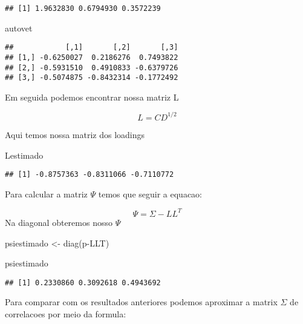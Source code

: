 \documentclass[
]{article}
\newenvironment{Shaded}{\begin{snugshade}}{\end{snugshade}}
\newcommand{\FunctionTok}[1]{\textcolor[rgb]{0.00,0.00,0.00}{#1}}
\newcommand{\NormalTok}[1]{#1}
\newcommand{\OtherTok}[1]{\textcolor[rgb]{0.56,0.35,0.01}{#1}}
\newcommand{\SpecialCharTok}[1]{\textcolor[rgb]{0.00,0.00,0.00}{#1}}
\begin{document}
\begin{verbatim}
## [1] 1.9632830 0.6794930 0.3572239
\end{verbatim}

\begin{Shaded}
\begin{Highlighting}[]
\NormalTok{autovet}
\end{Highlighting}
\end{Shaded}

\begin{verbatim}
##            [,1]       [,2]       [,3]
## [1,] -0.6250027  0.2186276  0.7493822
## [2,] -0.5931510  0.4910833 -0.6379726
## [3,] -0.5074875 -0.8432314 -0.1772492
\end{verbatim}

Em seguida podemos encontrar nossa matriz L

\[
L = CD^{1/2}
\]

Aqui temos nossa matriz dos loadings

\begin{Shaded}
\begin{Highlighting}[]
\NormalTok{Lestimado}
\end{Highlighting}
\end{Shaded}

\begin{verbatim}
## [1] -0.8757363 -0.8311066 -0.7110772
\end{verbatim}

Para calcular a matriz \(\Psi\) temos que seguir a equacao:

\[
 \Psi = \Sigma - LL^T
\] Na diagonal obteremos nosso \(\Psi\)

\begin{Shaded}
\begin{Highlighting}[]
\NormalTok{psiestimado }\OtherTok{\textless{}{-}} \FunctionTok{diag}\NormalTok{(p}\SpecialCharTok{{-}}\NormalTok{LLT)}
\end{Highlighting}
\end{Shaded}

\begin{Shaded}
\begin{Highlighting}[]
\NormalTok{psiestimado}
\end{Highlighting}
\end{Shaded}

\begin{verbatim}
## [1] 0.2330860 0.3092618 0.4943692
\end{verbatim}

Para comparar com os resultados anteriores podemos aproximar a matrix
\(\Sigma\) de correlacoes por meio da formula:
\end{document}
